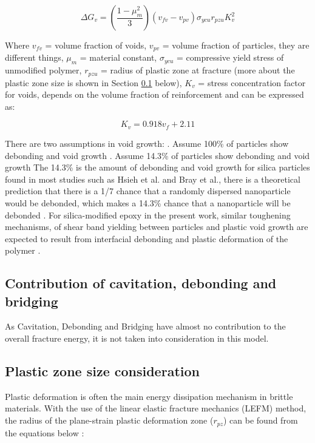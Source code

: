 \documentclass[numbers=noendperiod,chapterprefix=on]{icldt} %
\begin{document}
\begin{equation} 
\Delta G_v=\left( \frac{1-\mu_m^2}{3}\right) 
(v_{fv}-v_{pv}
)\sigma_{ycu} r_{pzu} K_v^2
\end{equation}

Where $v_{fv}$ = volume fraction of voids, $v_{pv}$ = volume fraction of particles, they are different things, $\mu _m$ = material constant, $\sigma_{ycu}$ = compressive yield stress of unmodified polymer, $r_{pzu}$ = radius of plastic zone at fracture (more about the plastic zone size is shown in Section \ref{Cavitation} below), $K_v$ = stress concentration factor for voids, depends on the volume fraction of reinforcement and can be expressed as:

\begin{equation} 
K_v=0.918v_f+2.11
\end{equation}

There are two assumptions in void growth:
.	Assume 100\% of particles show debonding and void growth 
.	Assume 14.3\% of particles show debonding and void growth
\newline
The 14.3\% is the amount of debonding and void growth for silica particles found in most studies such as Hsieh et al.\cite{Mohammed2007} and Bray et al.\cite{Masania2010}, there is a theoretical prediction that there is a 1/7 chance that a randomly dispersed nanoparticle would be debonded, which makes a 14.3\% chance that a nanoparticle will be debonded \cite{Masania2010}.
For silica-modified epoxy in the present work, similar toughening mechanisms, of shear band yielding between particles and plastic void growth are expected to result from interfacial debonding and plastic deformation of the polymer \cite{Mohammed2007}. 

\subsection{Contribution of cavitation, debonding and bridging} \label{Cavitation}
As Cavitation, Debonding and Bridging have almost no contribution to the overall fracture energy, it is not taken into consideration in this model.


\subsection{Plastic zone size consideration}
Plastic deformation is often the main energy dissipation mechanism in brittle materials. With the use of the linear elastic fracture mechanics (LEFM) method, the radius of the plane-strain plastic deformation zone ($r_{pz}$) can be found from the equations below \cite{Chen2013}:\\
\end{document}
